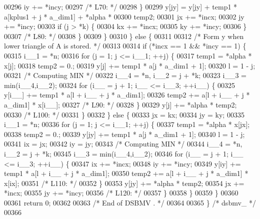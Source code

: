 \begin{DoxyCode}
00296             iy += *incy;
00297 \textcolor{comment}{/* L70: */}
00298         \}
00299         y[jy] = y[jy] + temp1 * a[kplus1 + j * a\_dim1] + *alpha * 
00300             temp2;
00301         jx += *incx;
00302         jy += *incy;
00303         \textcolor{keywordflow}{if} (j > *k) \{
00304             kx += *incx;
00305             ky += *incy;
00306         \}
00307 \textcolor{comment}{/* L80: */}
00308         \}
00309     \}
00310     \} \textcolor{keywordflow}{else} \{
00311 
00312 \textcolor{comment}{/*        Form  y  when lower triangle of A is stored. */}
00313 
00314     \textcolor{keywordflow}{if} (*incx == 1 && *incy == 1) \{
00315         i\_\_1 = *n;
00316         \textcolor{keywordflow}{for} (j = 1; j <= i\_\_1; ++j) \{
00317         temp1 = *alpha * x[j];
00318         temp2 = 0.;
00319         y[j] += temp1 * a[j * a\_dim1 + 1];
00320         l = 1 - j;
00321 \textcolor{comment}{/* Computing MIN */}
00322         i\_\_4 = *n, i\_\_2 = j + *k;
00323         i\_\_3 = min(i\_\_4,i\_\_2);
00324         \textcolor{keywordflow}{for} (i\_\_ = j + 1; i\_\_ <= i\_\_3; ++i\_\_) \{
00325             y[i\_\_] += temp1 * a[l + i\_\_ + j * a\_dim1];
00326             temp2 += a[l + i\_\_ + j * a\_dim1] * x[i\_\_];
00327 \textcolor{comment}{/* L90: */}
00328         \}
00329         y[j] += *alpha * temp2;
00330 \textcolor{comment}{/* L100: */}
00331         \}
00332     \} \textcolor{keywordflow}{else} \{
00333         jx = kx;
00334         jy = ky;
00335         i\_\_1 = *n;
00336         \textcolor{keywordflow}{for} (j = 1; j <= i\_\_1; ++j) \{
00337         temp1 = *alpha * x[jx];
00338         temp2 = 0.;
00339         y[jy] += temp1 * a[j * a\_dim1 + 1];
00340         l = 1 - j;
00341         ix = jx;
00342         iy = jy;
00343 \textcolor{comment}{/* Computing MIN */}
00344         i\_\_4 = *n, i\_\_2 = j + *k;
00345         i\_\_3 = min(i\_\_4,i\_\_2);
00346         \textcolor{keywordflow}{for} (i\_\_ = j + 1; i\_\_ <= i\_\_3; ++i\_\_) \{
00347             ix += *incx;
00348             iy += *incy;
00349             y[iy] += temp1 * a[l + i\_\_ + j * a\_dim1];
00350             temp2 += a[l + i\_\_ + j * a\_dim1] * x[ix];
00351 \textcolor{comment}{/* L110: */}
00352         \}
00353         y[jy] += *alpha * temp2;
00354         jx += *incx;
00355         jy += *incy;
00356 \textcolor{comment}{/* L120: */}
00357         \}
00358     \}
00359     \}
00360 
00361     \textcolor{keywordflow}{return} 0;
00362 
00363 \textcolor{comment}{/*     End of DSBMV . */}
00364 
00365 \} \textcolor{comment}{/* dsbmv\_ */}
00366 
\end{DoxyCode}
